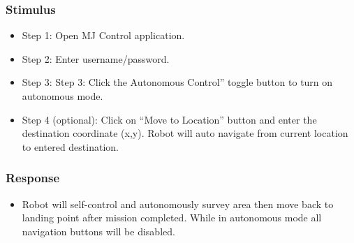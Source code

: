 \documentclass[10pt,a4paper,titlepage]{article}
\begin{document}
	\subsubsection*{Stimulus}
	\begin{itemize}
		\item Step 1: Open MJ Control application.
		\item Step 2: Enter username/password.
		\item Step 3: Step 3: Click the Autonomous Control” toggle button to turn on autonomous mode.
		\item Step 4 (optional): Click on “Move to Location” button and enter the destination coordinate (x,y). Robot will auto navigate from current location to entered destination.
	\end{itemize}
	
	\subsubsection*{Response}
	\begin{itemize}
		\item Robot will self-control and autonomously survey area then move back to landing point after mission completed. While in autonomous mode all navigation buttons will be disabled.
	\end{itemize}
	
\end{document}
